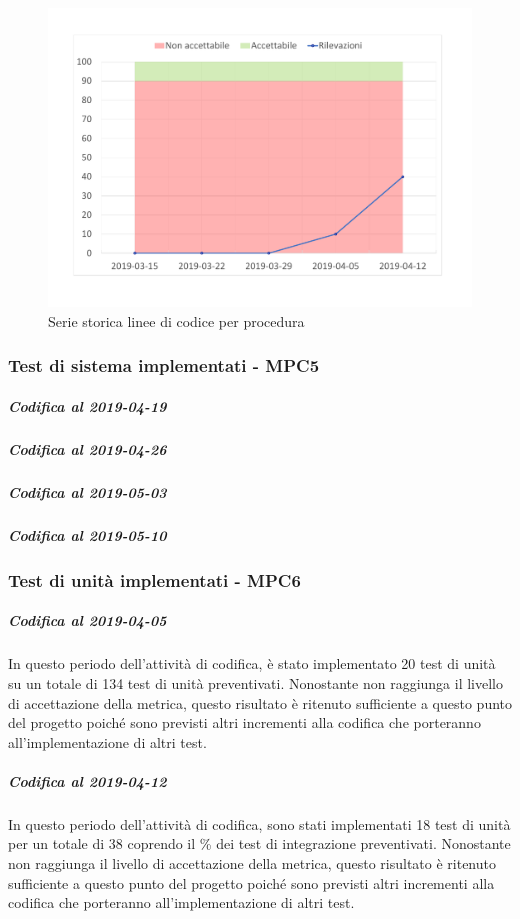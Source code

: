 \begin{figure}[H]
	\centering
	\includegraphics[scale=0.6]{images/resoconto/MPC4Chart.pdf}
	\caption{Serie storica linee di codice per procedura}	
\end{figure}

\subsubsection{Test di sistema implementati - MPC5}
\subparagraph{Codifica al 2019-04-19}


\subparagraph{Codifica al 2019-04-26}


\subparagraph{Codifica al 2019-05-03}


\subparagraph{Codifica al 2019-05-10}




\subsubsection{Test di unità implementati - MPC6}
\subparagraph{Codifica al 2019-04-05}
In questo periodo dell'attività di codifica, è stato implementato 20 test di unità su un totale di 134 test di unità preventivati.
Nonostante non raggiunga il livello di accettazione della
metrica, questo risultato è ritenuto sufficiente a questo punto del progetto poiché sono previsti altri incrementi alla codifica che porteranno all'implementazione di altri test.

\subparagraph{Codifica al 2019-04-12}
In questo periodo dell'attività di codifica, sono stati implementati 18 test di unità per un totale di 38 coprendo il \% dei test di integrazione preventivati.
Nonostante non raggiunga il livello di accettazione della
metrica, questo risultato è ritenuto sufficiente a questo punto del progetto poiché sono previsti altri incrementi alla codifica che porteranno all'implementazione di altri test.

